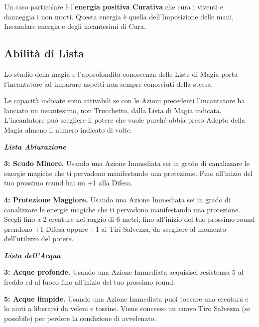 \begin{multicols}{2}
Un caso particolare è l'\textbf{energia positiva Curativa} che cura i viventi e danneggia i non morti. Questa energia è quella dell'Imposizione delle mani, Incanalare energia e degli incantesimi di Cura.


\subsection{Abilità di Lista}\label{abilitadilista}\hypertarget{abilitadilista}{}



Lo studio della magia e l'approfondita conoscenza delle Liste di Magia porta l'incantatore ad imparare aspetti non sempre conosciuti della stessa.

Le capacità indicate sono attivabili se con le Azioni precedenti l'incantatore ha lanciato un incantesimo, non Trucchetto, dalla Lista di Magia indicata. L'incantatore può scegliere il potere che vuole purché abbia preso Adepto della Magia almeno il numero indicato di volte.

\emph{\textbf{Lista Abiurazione}}

\textbf{3: Scudo Minore.} Usando una Azione Immediata sei in grado di canalizzare le energie magiche che ti pervadono manifestando una protezione. Fino all'inizio del tuo prossimo round hai un +1 alla Difesa.

\textbf{4: Protezione Maggiore.} Usando una Azione Immediata sei in grado di canalizzare le energie magiche che ti pervadono manifestando una protezione. Scegli fino a 2 creature nel raggio di 6 metri, fino all'inizio del tuo prossimo round prendono +1 Difesa oppure +1 ai Tiri Salvezza, da scegliere al momento dell'utilizzo del potere.

\emph{\textbf{Lista dell'Acqua}}

\textbf{3: Acque profonde.} Usando una Azione Immediata acquisisci resistenza 5 al freddo ed al fuoco fino all'inizio del tuo prossimo round.

\textbf{5: Acque limpide.} Usando una Azione Immediata puoi toccare una creatura e lo aiuti a liberarsi da veleni e tossine. Viene concesso un nuovo Tiro Salvezza (se possibile) per perdere la condizione di avvelenato.


\end{multicols}
